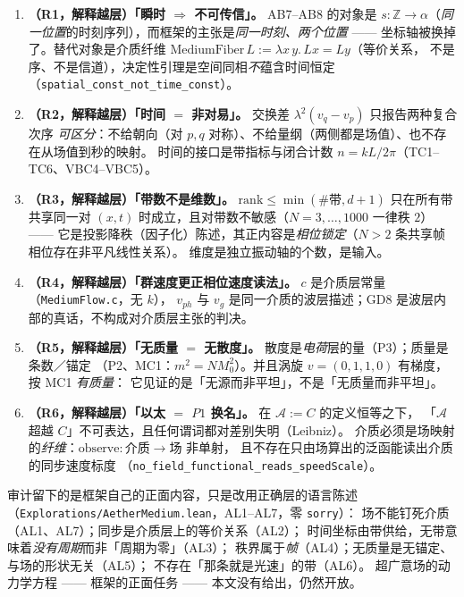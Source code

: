 \documentclass[aps,prd,preprint,superscriptaddress,amsmath,amssymb]{revtex4-2}
\begin{document}
\begin{enumerate}
\item \textbf{（R1，解释越层）「瞬时 $\Rightarrow$ 不可传信」。} AB7--AB8 的对象是
$s:\mathbb{Z}\to\alpha$（\emph{同一位置}的时刻序列），而框架的主张是\emph{同一时刻、两个位置} ——
坐标轴被换掉了。替代对象是介质纤维 $\mathrm{MediumFiber}\,L:=\lambda x\,y.\,Lx=Ly$（等价关系，
不是序、不是信道），决定性引理是空间同相\emph{不}蕴含时间恒定
（\texttt{spatial\_const\_not\_time\_const}）。
\item \textbf{（R2，解释越层）「时间 $=$ 非对易」。} 交换差 $\lambda^{2}(v_q-v_p)$ 只报告两种复合次序
\emph{可区分}：不给朝向（对 $p,q$ 对称）、不给量纲（两侧都是场值）、也不存在从场值到秒的映射。
时间的接口是带指标与闭合计数 $n=kL/2\pi$（TC1--TC6、VBC4--VBC5）。
\item \textbf{（R3，解释越层）「带数不是维数」。} $\mathrm{rank}\le\min(\#\text{带},d+1)$ 只在所有带
共享同一对 $(x,t)$ 时成立，且对带数不敏感（$N=3,\dots,1000$ 一律秩 $2$）——
它是投影降秩（因子化）陈述，其正内容是\emph{相位锁定}（$N>2$ 条共享帧相位存在非平凡线性关系）。
维度是独立振动轴的个数，是输入。
\item \textbf{（R4，解释越层）「群速度更正相位速度读法」。} $c$ 是介质层常量（\texttt{MediumFlow.c}，无 $k$），
$v_{ph}$ 与 $v_g$ 是同一介质的波层描述；GD8 是波层内部的真话，不构成对介质层主张的判决。
\item \textbf{（R5，解释越层）「无质量 $=$ 无散度」。} 散度是\emph{电荷}层的量（P3）；质量是条数／锚定
（P2、MC1：$m^{2}=NM_0^{2}$）。并且涡旋 $v=(0,1,1,0)$ 有梯度，按 MC1 \emph{有质量}：
它见证的是「无源而非平坦」，不是「无质量而非平坦」。
\item \textbf{（R6，解释越层）「以太 $=$ $P1$ 换名」。} 在 $\mathcal{A}:=C$ 的定义恒等之下，
「$\mathcal{A}$ 超越 $C$」不可表达，且任何谓词都对差别失明（Leibniz）。
介质必须是场映射的\emph{纤维}：$\mathrm{observe}:\text{介质}\to\text{场}$ 非单射，
且不存在只由场算出的泛函能读出介质的同步速度标度
（\texttt{no\_field\_functional\_reads\_speedScale}）。
\end{enumerate}

\begin{sloppypar}
审计留下的是框架自己的正面内容，只是改用正确层的语言陈述
（\texttt{Explorations/AetherMedium.lean}，AL1--AL7，零 \texttt{sorry}）：
场不能钉死介质（AL1、AL7）；同步是介质层上的等价关系（AL2）；
时间坐标由带供给，无带意味着\emph{没有周期}而非「周期为零」（AL3）；
秩界属于\emph{帧}（AL4）；无质量是无锚定、与场的形状无关（AL5）；
不存在「那条就是光速」的带（AL6）。
超广意场的动力学方程 —— 框架的正面任务 —— 本文没有给出，仍然开放。
\end{sloppypar}
\end{document}
